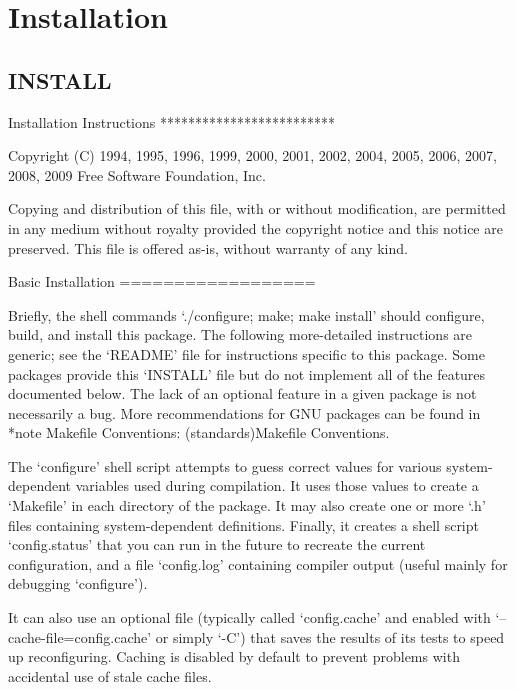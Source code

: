 \section{Installation}
\label{group__install}
\subsection{INSTALL}\label{group__install_install}

\begin{DoxyCodeInclude}
Installation Instructions
*************************

Copyright (C) 1994, 1995, 1996, 1999, 2000, 2001, 2002, 2004, 2005,
2006, 2007, 2008, 2009 Free Software Foundation, Inc.

   Copying and distribution of this file, with or without modification,
are permitted in any medium without royalty provided the copyright
notice and this notice are preserved.  This file is offered as-is,
without warranty of any kind.

Basic Installation
==================

   Briefly, the shell commands `./configure; make; make install' should
configure, build, and install this package.  The following
more-detailed instructions are generic; see the `README' file for
instructions specific to this package.  Some packages provide this
`INSTALL' file but do not implement all of the features documented
below.  The lack of an optional feature in a given package is not
necessarily a bug.  More recommendations for GNU packages can be found
in *note Makefile Conventions: (standards)Makefile Conventions.

   The `configure' shell script attempts to guess correct values for
various system-dependent variables used during compilation.  It uses
those values to create a `Makefile' in each directory of the package.
It may also create one or more `.h' files containing system-dependent
definitions.  Finally, it creates a shell script `config.status' that
you can run in the future to recreate the current configuration, and a
file `config.log' containing compiler output (useful mainly for
debugging `configure').

   It can also use an optional file (typically called `config.cache'
and enabled with `--cache-file=config.cache' or simply `-C') that saves
the results of its tests to speed up reconfiguring.  Caching is
disabled by default to prevent problems with accidental use of stale
cache files.


\end{DoxyCodeInclude}

